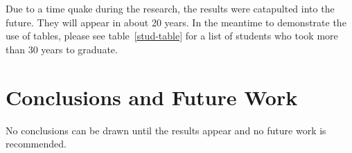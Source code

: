 \documentclass[11pt]{report}
\begin{document}
Due to a time quake during the research, the results were catapulted into the future.  They will appear in about 20 years.
In the meantime to demonstrate the use of tables, please see table~\ref{stud-table} for a list of students who took more than 30 years to graduate.

\chapter{Conclusions and Future Work}
No conclusions can be drawn until the results appear and no future work is recommended.




\end{document}
